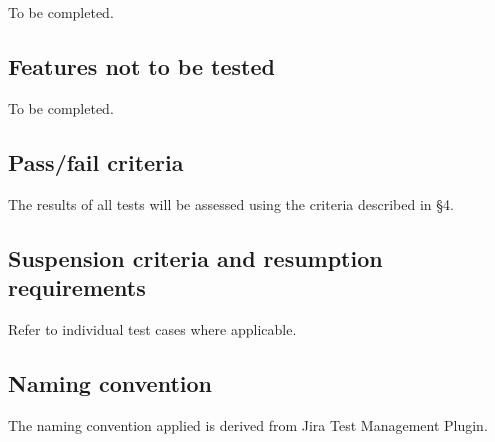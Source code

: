 \documentclass[DM,lsstdraft,STS,toc]{lsstdoc}
\begin{document}
To be completed.

\subsection{Features not to be tested}
\label{sec:featnot2test}

To be completed.

\subsection{Pass/fail criteria}
\label{sec:passfail}

The results of all tests will be assessed using the criteria described in
 \S4.


\subsection{Suspension criteria and resumption requirements}
\label{suspension}

Refer to individual test cases where applicable.

\subsection{Naming convention}

The naming convention applied is derived from Jira Test Management Plugin.


%
\end{document}
